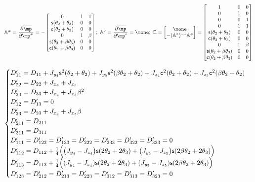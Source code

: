 \documentclass[a4paper,11pt,brazil,fleqn]{article}
\begin{document}
\begin{equation}
\mA\ssh = \frac{\partial \overline{\mp}}{\partial \mp\ssh} = -
\begin{bmatrix}
0 & 1 & 1 \\
\ssin(\theta_2+\theta_3) & 0 & 0 \\
\ccos(\theta_2+\theta_3) & 0 & 0 \\
0 & 1 & \beta \\
\ssin(\theta_2+\beta\theta_3) & 0 & 0 \\
\ccos(\theta_2+\beta\theta_3) & 0 & 0 \\
\end{bmatrix}; \;
\mA^\circ = \frac{\partial \overline{\mp}}{\partial \mp^\circ} = \mone; \;
\mC =
\begin{bmatrix}
\mone \\
-(\mA^\circ)^{-1} \mA\ssh
\end{bmatrix}  =
\begin{bmatrix}
1 & 0 & 0 \\
0 & 1 & 0 \\
0 & 0 & 1 \\
0 & 1 & 1 \\
\ssin(\theta_2+\theta_3) & 0 & 0 \\
\ccos(\theta_2+\theta_3) & 0 & 0 \\
0 & 1 & \beta \\
\ssin(\theta_2+\beta\theta_3) & 0 & 0 \\
\ccos(\theta_2+\beta\theta_3) & 0 & 0 \\
\end{bmatrix} 
\end{equation}

\begin{equation}
\begin{cases}
D'_{11} = D_{11} + J_{y_4}\mathsf{s}^2(\theta_2+\theta_2) + J_{y_5}\mathsf{s}^2(\beta\theta_2+\theta_2) + J_{z_4}\mathsf{c}^2(\theta_2+\theta_2) + J_{z_5}\mathsf{c}^2(\beta\theta_2+\theta_2) \\
D'_{22} = D_{22} + J_{x_4} + J_{x_5} \\
D'_{33} = D_{33} + J_{x_4} + J_{x_5} \beta^2\\
D'_{12} = D'_{13} = 0\\
D'_{23} = D_{23} + J_{x_4} + J_{x_5} \beta \\
D'_{211} = D_{211} \\
D'_{311} = D_{311} \\
D'_{111} = D'_{122} = D'_{133} = D'_{222} = D'_{233} = D'_{322} = D'_{333} = 0 \\
D'_{112} = D_{112} +  \frac{1}{4} \Big( \big(J_{y_4} - J_{z_4}\big)\mathsf{s}(2\theta_2+2\theta_3) + \big(J_{y_5} - J_{z_5}\big)\mathsf{s}(2\beta\theta_2+2\theta_3) \Big) \\
D'_{113} =  D_{113} + \frac{1}{4} \Big( (J_{y_4} - J_{z_4})\mathsf{s}(2\theta_2+2\theta_3) + (J_{y_5} - J_{z_5})\mathsf{s}(2\beta\theta_2+2\theta_3) \Big) \\
D'_{123} = D'_{212} = D'_{213} = D'_{223} = D'_{312} = D'_{313} = D'_{323} = 0 \\
\end{cases}
\end{equation}
\end{document}
